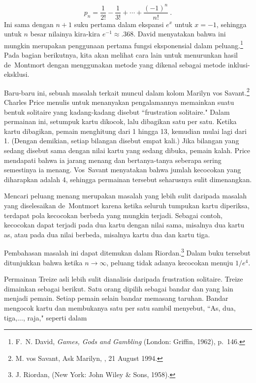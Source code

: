 $$ p_n = \frac1{2!} - \frac1{3!} + \cdots + \frac{(-1)^n}{n!}\ .
$$ Ini sama dengan $n + 1$ suku pertama dalam ekspansi $e^x$ untuk $x = -1$, sehingga
untuk $n$ besar nilainya kira-kira $e^{-1} \approx .368$.  David
 menyatakan bahwa ini mungkin merupakan penggunaan pertama fungsi
eksponensial dalam peluang.\footnote{F.~N. David, {\em Games, Gods and Gambling} (London: Griffin,
1962), p.~146.}  Pada bagian berikutnya, kita akan melihat cara lain untuk menurunkan
hasil de~Montmort dengan menggunakan metode yang dikenal sebagai metode inklusi-eksklusi.
\par
Baru-baru ini, sebuah masalah terkait muncul dalam kolom Marilyn vos Savant.\footnote{M.
vos Savant, Ask Marilyn, , 21
August 1994.}  Charles Price menulis untuk
menanyakan pengalamannya memainkan suatu bentuk solitaire yang kadang-kadang disebut
``frustration solitaire."  Dalam permainan ini, setumpuk
kartu dikocok, lalu dibagikan satu per satu.  Ketika kartu dibagikan, pemain menghitung
dari 1 hingga 13, kemudian mulai lagi dari 1.  (Dengan demikian, setiap bilangan disebut
empat kali.)  Jika bilangan yang sedang disebut sama dengan nilai kartu yang sedang
dibuka, pemain kalah.  Price mendapati bahwa ia jarang menang dan bertanya-tanya seberapa
sering semestinya ia menang.  Vos~Savant menyatakan bahwa jumlah kecocokan yang diharapkan
adalah 4, sehingga permainan tersebut seharusnya sulit dimenangkan.
\par
Mencari peluang menang merupakan masalah yang lebih sulit daripada masalah yang
diselesaikan de~Montmort karena ketika seluruh tumpukan kartu diperiksa, terdapat pola
kecocokan berbeda yang mungkin terjadi.  Sebagai contoh, kecocokan dapat terjadi pada
dua kartu dengan nilai sama, misalnya dua kartu as, atau pada dua nilai berbeda,
misalnya kartu dua dan kartu tiga.
\par
Pembahasan masalah ini dapat ditemukan dalam Riordan.\footnote{J. Riordan,  (New York: John Wiley \& Sons, 1958).}
Dalam buku tersebut ditunjukkan bahwa ketika $n \rightarrow \infty$, peluang tidak
adanya kecocokan menuju $1/e^4$.
\par
Permainan Treize asli lebih sulit dianalisis daripada frustration solitaire.  Treize
dimainkan sebagai berikut.  Satu orang dipilih sebagai bandar dan yang lain menjadi
pemain.  Setiap pemain selain bandar memasang taruhan.  Bandar mengocok kartu dan
membukanya satu per satu sambil menyebut, ``As, dua, tiga,..., raja," seperti dalam
